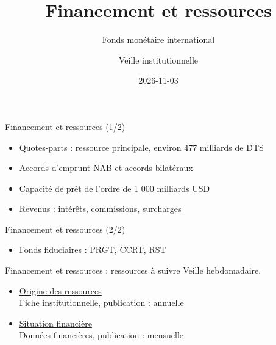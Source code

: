 \documentclass[aspectratio=169,11pt]{beamer}
\title{Financement et ressources}
\subtitle{Fonds monétaire international}
\author{Veille institutionnelle}
\date{2026-11-03}
\begin{document}
\begin{frame}\titlepage\end{frame}

\begin{frame}{Financement et ressources (1/2)}
\begin{itemize}
\item Quotes-parts : ressource principale, environ 477 milliards de DTS
\item Accords d'emprunt NAB et accords bilatéraux
\item Capacité de prêt de l'ordre de 1 000 milliards USD
\item Revenus : intérêts, commissions, surcharges
\end{itemize}
\end{frame}

\begin{frame}{Financement et ressources (2/2)}
\begin{itemize}
\item Fonds fiduciaires : PRGT, CCRT, RST
\end{itemize}
\end{frame}

\begin{frame}{Financement et ressources : ressources à suivre}
\small
Veille hebdomadaire.
\begin{itemize}
\item \href{https://www.imf.org/en/About/Factsheets/Sheets/2023/Where-the-IMF-gets-its-money}{Origine des ressources}\\{\footnotesize Fiche institutionnelle, publication : annuelle}
\item \href{https://www.imf.org/external/np/fin/tad/extarr2.aspx}{Situation financière}\\{\footnotesize Données financières, publication : mensuelle}
\end{itemize}
\end{frame}
\end{document}
